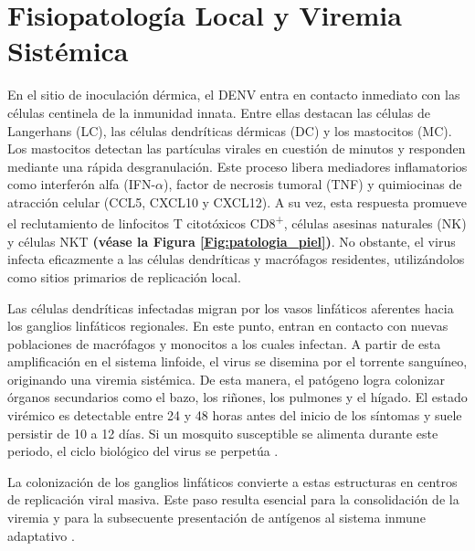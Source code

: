 \section{Fisiopatología Local y Viremia Sistémica}
 En el sitio de inoculación dérmica, el DENV entra en contacto inmediato con las células centinela de la inmunidad innata. Entre ellas destacan las células de Langerhans (LC), las células dendríticas dérmicas (DC) y los mastocitos (MC). Los mastocitos detectan las partículas virales en cuestión de minutos y responden mediante una rápida desgranulación. Este proceso libera mediadores inflamatorios como interferón alfa (IFN-$\alpha$), factor de necrosis tumoral (TNF) y quimiocinas de atracción celular (CCL5, CXCL10 y CXCL12). A su vez, esta respuesta promueve el reclutamiento de linfocitos T citotóxicos CD8\textsuperscript{+}, células asesinas naturales (NK) y células NKT \textbf{(véase la Figura \ref{Fig:patologia_piel})}. No obstante, el virus infecta eficazmente a las células dendríticas y macrófagos residentes, utilizándolos como sitios primarios de replicación local. %

Las células dendríticas infectadas migran por los vasos linfáticos aferentes hacia los ganglios linfáticos regionales. En este punto, entran en contacto con nuevas poblaciones de macrófagos y monocitos a los cuales infectan. A partir de esta amplificación en el sistema linfoide, el virus se disemina por el torrente sanguíneo, originando una viremia sistémica. De esta manera, el patógeno logra colonizar órganos secundarios como el bazo, los riñones, los pulmones y el hígado. El estado virémico es detectable entre 24 y 48 horas antes del inicio de los síntomas y suele persistir de 10 a 12 días. Si un mosquito susceptible se alimenta durante este periodo, el ciclo biológico del virus se perpetúa \cite{nanaware2021dengue}.

La colonización de los ganglios linfáticos convierte a estas estructuras en centros de replicación viral masiva. Este paso resulta esencial para la consolidación de la viremia y para la subsecuente presentación de antígenos al sistema inmune adaptativo \cite{st2019adaptive}.

